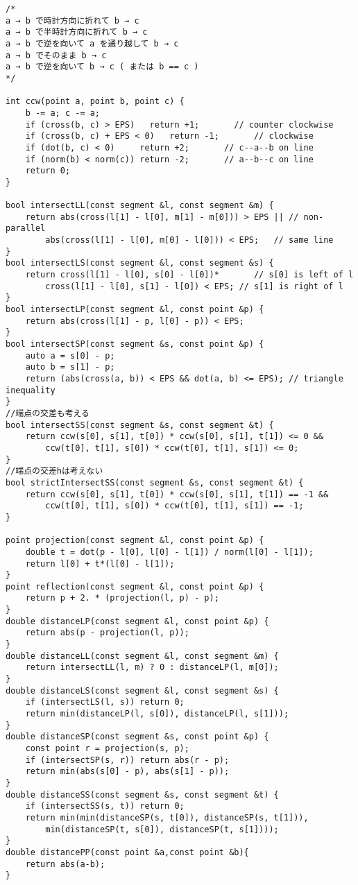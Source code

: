 \documentclass[10pt]{article}
\begin{document}
\begin{lstlisting}
/*
a → b で時計方向に折れて b → c
a → b で半時計方向に折れて b → c
a → b で逆を向いて a を通り越して b → c
a → b でそのまま b → c
a → b で逆を向いて b → c ( または b == c )
*/

int ccw(point a, point b, point c) {
	b -= a; c -= a;
	if (cross(b, c) > EPS)   return +1;       // counter clockwise
	if (cross(b, c) + EPS < 0)   return -1;       // clockwise
	if (dot(b, c) < 0)     return +2;       // c--a--b on line
	if (norm(b) < norm(c)) return -2;       // a--b--c on line
	return 0;
}

bool intersectLL(const segment &l, const segment &m) {
	return abs(cross(l[1] - l[0], m[1] - m[0])) > EPS || // non-parallel
		abs(cross(l[1] - l[0], m[0] - l[0])) < EPS;   // same line
}
bool intersectLS(const segment &l, const segment &s) {
	return cross(l[1] - l[0], s[0] - l[0])*       // s[0] is left of l
		cross(l[1] - l[0], s[1] - l[0]) < EPS; // s[1] is right of l
}
bool intersectLP(const segment &l, const point &p) {
	return abs(cross(l[1] - p, l[0] - p)) < EPS;
}
bool intersectSP(const segment &s, const point &p) {
	auto a = s[0] - p;
	auto b = s[1] - p;
	return (abs(cross(a, b)) < EPS && dot(a, b) <= EPS); // triangle inequality
}
//端点の交差も考える
bool intersectSS(const segment &s, const segment &t) {
	return ccw(s[0], s[1], t[0]) * ccw(s[0], s[1], t[1]) <= 0 &&
		ccw(t[0], t[1], s[0]) * ccw(t[0], t[1], s[1]) <= 0;
}
//端点の交差hは考えない
bool strictIntersectSS(const segment &s, const segment &t) {
	return ccw(s[0], s[1], t[0]) * ccw(s[0], s[1], t[1]) == -1 &&
		ccw(t[0], t[1], s[0]) * ccw(t[0], t[1], s[1]) == -1;
}

point projection(const segment &l, const point &p) {
	double t = dot(p - l[0], l[0] - l[1]) / norm(l[0] - l[1]);
	return l[0] + t*(l[0] - l[1]);
}
point reflection(const segment &l, const point &p) {
	return p + 2. * (projection(l, p) - p);
}
double distanceLP(const segment &l, const point &p) {
	return abs(p - projection(l, p));
}
double distanceLL(const segment &l, const segment &m) {
	return intersectLL(l, m) ? 0 : distanceLP(l, m[0]);
}
double distanceLS(const segment &l, const segment &s) {
	if (intersectLS(l, s)) return 0;
	return min(distanceLP(l, s[0]), distanceLP(l, s[1]));
}
double distanceSP(const segment &s, const point &p) {
	const point r = projection(s, p);
	if (intersectSP(s, r)) return abs(r - p);
	return min(abs(s[0] - p), abs(s[1] - p));
}
double distanceSS(const segment &s, const segment &t) {
	if (intersectSS(s, t)) return 0;
	return min(min(distanceSP(s, t[0]), distanceSP(s, t[1])),
		min(distanceSP(t, s[0]), distanceSP(t, s[1])));
}
double distancePP(const point &a,const point &b){
	return abs(a-b);
}


\end{lstlisting}
\end{document}
